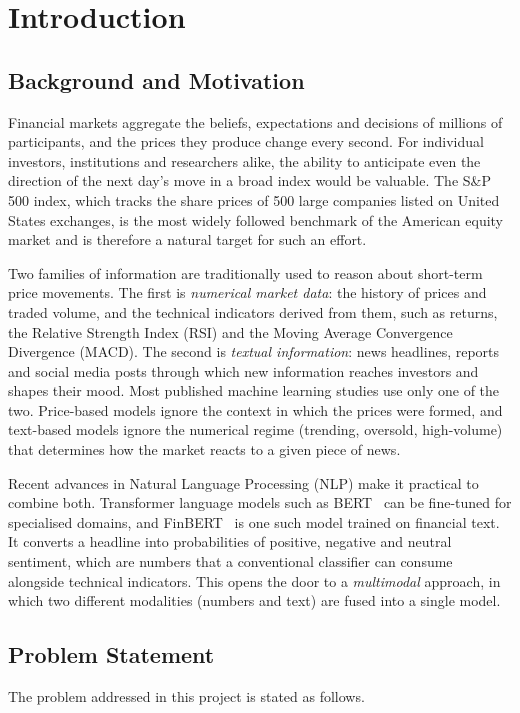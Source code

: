 \chapter{Introduction}

\section{Background and Motivation}
Financial markets aggregate the beliefs, expectations and decisions of millions of participants, and the prices they produce change every second. For individual investors, institutions and researchers alike, the ability to anticipate even the direction of the next day's move in a broad index would be valuable. The S\&P 500 index, which tracks the share prices of 500 large companies listed on United States exchanges, is the most widely followed benchmark of the American equity market and is therefore a natural target for such an effort.

Two families of information are traditionally used to reason about short-term price movements. The first is \emph{numerical market data}: the history of prices and traded volume, and the technical indicators derived from them, such as returns, the Relative Strength Index (RSI) and the Moving Average Convergence Divergence (MACD). The second is \emph{textual information}: news headlines, reports and social media posts through which new information reaches investors and shapes their mood. Most published machine learning studies use only one of the two. Price-based models ignore the context in which the prices were formed, and text-based models ignore the numerical regime (trending, oversold, high-volume) that determines how the market reacts to a given piece of news.

Recent advances in Natural Language Processing (NLP) make it practical to combine both. Transformer language models such as BERT~\cite{devlin2019bert} can be fine-tuned for specialised domains, and FinBERT~\cite{araci2019finbert} is one such model trained on financial text. It converts a headline into probabilities of positive, negative and neutral sentiment, which are numbers that a conventional classifier can consume alongside technical indicators. This opens the door to a \emph{multimodal} approach, in which two different modalities (numbers and text) are fused into a single model.

\section{Problem Statement}
The problem addressed in this project is stated as follows.

